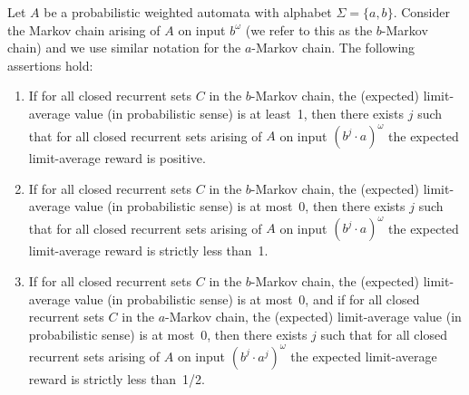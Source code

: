 \documentclass{llncs}
\def\set#1{\ensuremath{\{#1\}}}
\begin{document}
\begin{lemma}\label{lemm-long-enough-b}
Let $A$ be a probabilistic weighted automata with alphabet $\Sigma=\set{a,b}$.
Consider the Markov chain arising of $A$ on input $b^\omega$ (we refer 
to this as the $b$-Markov chain) and we use similar notation for the 
$a$-Markov chain.
The following assertions hold:
\begin{enumerate}
\item If for all closed recurrent sets $C$ in the $b$-Markov chain, the 
(expected) limit-average value (in probabilistic sense) is at least~1, 
then there exists $j$ such that for all closed recurrent sets arising 
of $A$ on input $(b^j \cdot a)^\omega$ the expected limit-average reward is 
positive.

\item If for all closed recurrent sets $C$ in the $b$-Markov chain, the 
(expected) limit-average value (in probabilistic sense) is at most~0, 
then there exists $j$ such that for all closed recurrent sets arising 
of $A$ on input $(b^j \cdot a)^\omega$ the expected limit-average reward is 
strictly less than~1.

\item If for all closed recurrent sets $C$ in the $b$-Markov chain, the 
(expected) limit-average value (in probabilistic sense) is at most~0,
and if for all closed recurrent sets $C$ in the $a$-Markov chain, the 
(expected) limit-average value (in probabilistic sense) is at most~0,
then there exists $j$ such that for all closed recurrent sets arising 
of $A$ on input $(b^j \cdot a^j)^\omega$ the expected limit-average reward is 
strictly less than~1/2.
\end{enumerate}
\end{lemma}
\end{document}
